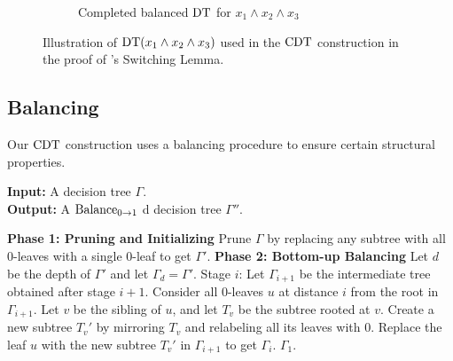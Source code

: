 \begin{figure}
\begin{subfigure}[h]{0.4\textwidth}
        \caption{Completed balanced $\operatorname{DT}$ for $x_1 \wedge x_2 \wedge x_3$}
    \end{subfigure}
    \caption{Illustration of $\operatorname{DT}(x_1\wedge x_2\wedge x_3)$ used in the $\operatorname{CDT}$ construction in the proof of \hastad's Switching Lemma.}
    \label{fig: term CDT}
\end{figure}


\subsection{Balancing}
Our $\operatorname{CDT}$ construction uses a balancing procedure to ensure certain structural properties.

\begin{algorithm}[H]
    \caption{$\zeroBal(\Gamma)$: Zero-Balancing Procedure}
    \label{alg:0-balancing}
    \textbf{Input:} A decision tree $\Gamma$. \\
    \textbf{Output:} A $\operatorname{Balance_{0 \to 1}}$ d decision tree $\Gamma''$.
    \begin{algorithmic}[1]
        \Statex \textbf{Phase 1: Pruning and Initializing}
        \State Prune $\Gamma$ by replacing any subtree with all 0-leaves with a single 0-leaf to get $\Gamma'$.
        \Statex \textbf{Phase 2: Bottom-up Balancing}
        \State Let $d$ be the depth of $\Gamma'$ and let $\Gamma_{d} = \Gamma'$.
        \Statex Stage $i$:
            \State Let $\Gamma_{i+1}$ be the intermediate tree obtained after stage $i+1$.
            \State Consider all $0$-leaves $u$ at distance $i$ from the root in $\Gamma_{i+1}$.
            \State Let $v$ be the sibling of $u$, and let $T_v$ be the subtree rooted at $v$.
            \State {}
            \State Create a new subtree $T_v'$ by mirroring $T_v$ and relabeling all its leaves with $0$.
            \State Replace the leaf $u$ with the new subtree $T_v'$ in $\Gamma_{i+1}$ to get $\Gamma_i$.
        \EndFor
        \State \Return $\Gamma_1$.
    \end{algorithmic}
\end{algorithm}

